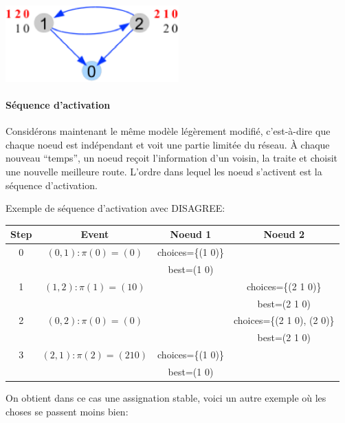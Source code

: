 \documentclass{report}
\begin{document}
\includegraphics[width=0.5\textwidth]{sppex6.eps}

\paragraph{Séquence d'activation}

Considérons maintenant le même modèle légèrement modifié, c'est-à-dire
que chaque noeud est indépendant et voit une partie limitée du
réseau. À chaque nouveau ``temps'', un noeud reçoit l'information d'un
voisin, la traite et choisit une nouvelle meilleure route. L'ordre
dans lequel les noeud s'activent est la séquence d'activation.

Exemple de séquence d'activation avec DISAGREE:

\begin{tabular}{|c|c|c|c|}
  \hline
  Step & Event & Noeud 1 & Noeud 2 \\
  \hline
  0 & $(0, 1): \pi(0) = (0)$ & choices=\{(1 0)\} & \\
  & & best=(1 0) & \\
  \hline
  1 & $(1, 2): \pi(1) = (1 0)$ & & choices=\{(2 1 0)\} \\
  & & & best=(2 1 0) \\
  \hline
  2 & $(0, 2): \pi(0) = (0)$ & & choices=\{(2 1 0), (2 0)\} \\
  & & & best=(2 1 0) \\
  \hline
  3 & $(2, 1): \pi(2) = (2 1 0)$ & choices=\{(1 0)\} & \\
  & & best=(1 0) & \\
  \hline
\end{tabular}

On obtient dans ce cas une assignation stable, voici un autre exemple
où les choses se passent moins bien:
\end{document}
